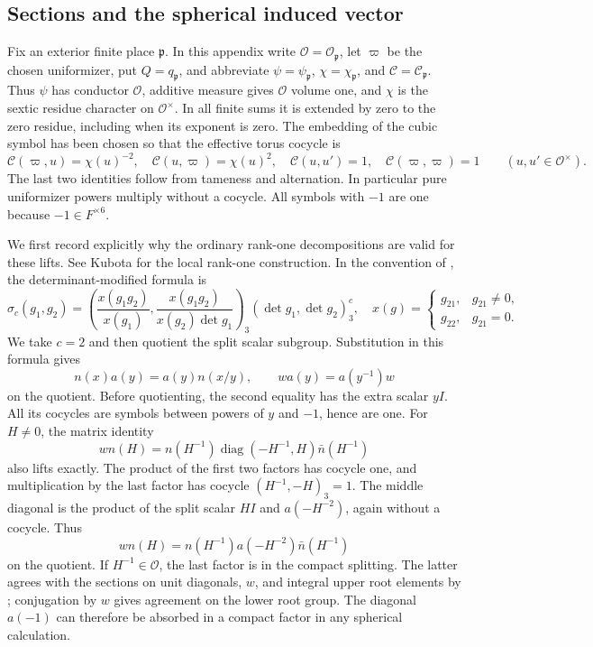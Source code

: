 \subsection{Sections and the spherical induced vector}

Fix an exterior finite place \(\mathfrak p\).  In this appendix write
\(\mathcal O=\mathcal O_{\mathfrak p}\), let \(\varpi\) be the chosen
uniformizer, put \(Q=q_{\mathfrak p}\), and abbreviate
\(\psi=\psi_{\mathfrak p}\), \(\chi=\chi_{\mathfrak p}\), and
\(\mathcal C=\mathcal C_{\mathfrak p}\).
Thus \(\psi\) has conductor \(\mathcal O\), additive measure gives
\(\mathcal O\) volume one, and \(\chi\) is the sextic residue
character on \(\mathcal O^\times\).  In all finite sums it is
extended by zero to the zero residue, including when its exponent is
zero.  The embedding of the cubic symbol has been chosen so that the
effective torus cocycle is
\begin{equation}\label{eq:app-torus-laws}
 \mathcal C(\varpi,u)=\chi(u)^{-2},\quad
 \mathcal C(u,\varpi)=\chi(u)^2,\quad
 \mathcal C(u,u')=1,\quad \mathcal C(\varpi,\varpi)=1
 \qquad(u,u'\in\mathcal O^\times).
\end{equation}
The last two identities follow from tameness and alternation.  In
particular pure uniformizer powers multiply without a cocycle.
All symbols with \(-1\) are one because \(-1\in F^{\times6}\).

We first record explicitly why the ordinary rank-one decompositions
are valid for these lifts.  See Kubota \cite[p.~114]{Kubota67} for the local
rank-one construction.  In the convention of
\cite[Section~0.1, p.~41]{KP84}, the determinant-modified formula is
\[
 \sigma_c(g_1,g_2)=
 \left(\frac{x(g_1g_2)}{x(g_1)},
       \frac{x(g_1g_2)}{x(g_2)\det g_1}\right)_3
       (\det g_1,\det g_2)_3^c,
 \quad
 x(g)=
 \begin{cases}
  g_{21},&g_{21}\ne0,\\
  g_{22},&g_{21}=0.
 \end{cases}
\]
We take \(c=2\) and then quotient the split scalar subgroup.
Substitution in this formula gives
\[
 n(x)a(y)=a(y)n(x/y),\qquad
 wa(y)=a(y^{-1})w
\]
on the quotient.  Before quotienting, the second equality has the
extra scalar \(yI\).  All its cocycles are symbols between powers of
\(y\) and \(-1\), hence are one.  For \(H\ne0\), the matrix identity
\[
 wn(H)=n(H^{-1})\operatorname{diag}(-H^{-1},H)\bar n(H^{-1})
\]
also lifts exactly.  The product of the first two factors has cocycle
one, and multiplication by the last factor has cocycle
\((H^{-1},-H)_3=1\).  The middle diagonal is
the product of the split scalar \(HI\) and \(a(-H^{-2})\), again
without a cocycle.  Thus
\begin{equation}\label{eq:app-bruhat-lift}
 wn(H)=n(H^{-1})a(-H^{-2})\bar n(H^{-1})
\end{equation}
on the quotient.  If \(H^{-1}\in\mathcal O\), the last factor is in
the compact splitting.  The latter agrees with the sections on unit
diagonals, \(w\), and integral upper root elements by
\cite[Proposition~0.1.3, p.~44]{KP84}; conjugation by \(w\) gives
agreement on the lower root group.  The diagonal \(a(-1)\) can
therefore be absorbed in a compact factor in any spherical
calculation.

